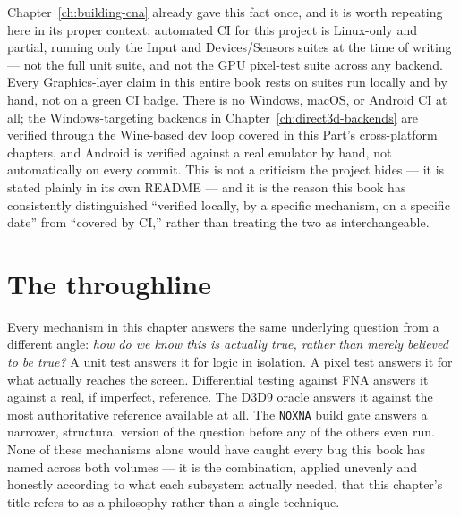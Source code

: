 Chapter~\ref{ch:building-cna} already gave this fact once, and it is worth
repeating here in its proper context: automated CI for this project is Linux-only and
partial, running only the Input and Devices/Sensors suites at the time of writing --- not the
full unit suite, and not the GPU pixel-test suite across any backend. Every Graphics-layer
claim in this entire book rests on suites run locally and by hand, not on a green CI badge.
There is no Windows, macOS, or Android CI at all; the Windows-targeting backends in
Chapter~\ref{ch:direct3d-backends} are verified through the Wine-based dev loop covered in
this Part's cross-platform chapters, and Android is verified against a real emulator by hand,
not automatically on every commit. This is not a criticism the project hides --- it is stated
plainly in its own README --- and it is the reason this book has consistently distinguished
``verified locally, by a specific mechanism, on a specific date'' from ``covered by CI,''
rather than treating the two as interchangeable.

\section{The throughline}

Every mechanism in this chapter answers the same underlying question from a different angle:
\emph{how do we know this is actually true, rather than merely believed to be true?} A unit
test answers it for logic in isolation. A pixel test answers it for what actually reaches the
screen. Differential testing against FNA answers it against a real, if imperfect, reference.
The D3D9 oracle answers it against the most authoritative reference available at all. The
\texttt{NOXNA} build gate answers a narrower, structural version of the question before any
of the others even run. None of these mechanisms alone would have caught every bug this book
has named across both volumes --- it is the combination, applied unevenly and honestly
according to what each subsystem actually needed, that this chapter's title refers to as a
philosophy rather than a single technique.
